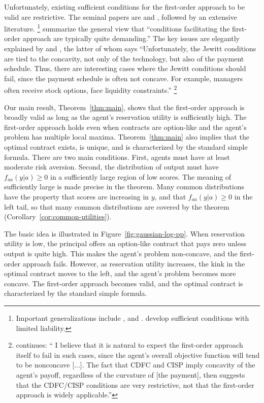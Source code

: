 Unfortunately, existing sufficient conditions for the first-order approach to be valid are restrictive. The seminal papers are \textcite{rogerson1985} and \textcite{jewitt1988justifying}, followed by an extensive literature.%
\footnote{Important generalizations include \textcite{sinclair1994first,conlon2009two,jung2015information,chade2020no}, and \textcite{jung2024proxy}. \textcite{chaigneau2022should, chaigneau2024theory} develop sufficient conditions with limited liability.}
\textcite{kadan2017existence} summarize the general view that ``conditions facilitating the first-order approach are typically quite demanding.'' The key issues are elegantly explained by \textcite{chaigneau2022should} and \textcite{conlon2009two}, the latter of whom says ``Unfortunately, the Jewitt conditions are tied to the concavity, not only of the technology, but also of the payment schedule. Thus, there are interesting cases where the Jewitt conditions should fail, since the payment schedule is often not concave. For example, managers often receive stock options, face liquidity constraints.''%
\footnote{\textcite{conlon2009two} continues: ``
I believe that it is natural to expect the first-order approach itself to fail in such cases, since the agent's overall objective function will tend to be nonconcave [...]. The fact that CDFC and CISP imply concavity of the agent's payoff, regardless of the curvature of [the payment], then suggests that the CDFC/CISP conditions are very restrictive, not that the first-order approach is widely applicable.''%
}

Our main result, Theorem~\ref{thm:main}, shows that the first-order approach is broadly valid as
long as the agent's reservation utility is sufficiently high. The first-order approach holds even when
contracts are option-like and the agent's problem has multiple local maxima. Theorem~\ref{thm:main} also implies that the optimal contract exists, is unique, and is characterized by the standard simple formula. There are two main conditions. First, agents must have at least moderate risk aversion. Second, the distribution of output must have $f_{aa}(y|a) \geq 0$ in a sufficiently large region of low scores. The meaning of sufficiently large is made precise in the theorem. Many common distributions have the property that scores are increasing in $y$, and that $f_{aa}(y|a) \geq 0$ in the left tail, so that many common distributions are covered by the theorem (Corollary~\ref{cor:common-utilities}).

The basic idea is illustrated in Figure~\ref{fig:gaussian-log-pp}. When reservation utility is low, the principal offers an option-like contract that pays zero unless output is quite high. This makes the agent's problem non-concave, and the first-order approach fails. However, as reservation utility increases, the kink in the optimal contract moves to the left, and the agent's problem becomes more concave. The first-order approach becomes valid, and the optimal contract is characterized by the standard simple formula.

